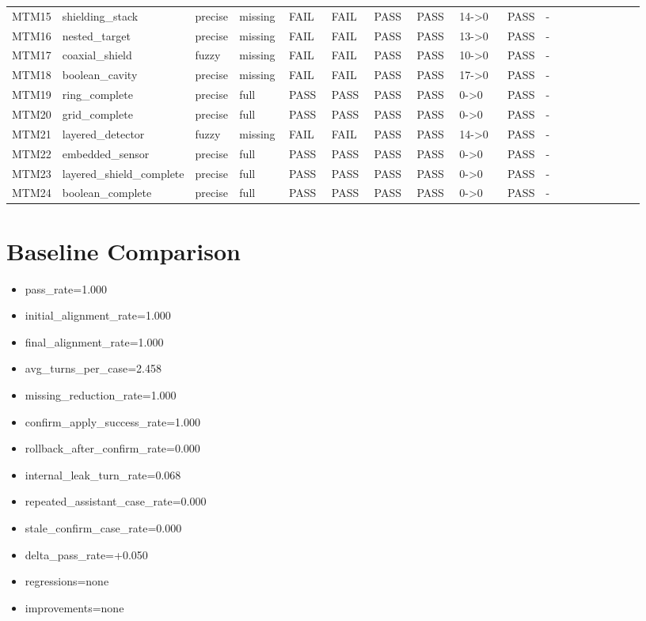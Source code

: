 \documentclass[11pt]{ctexart}
\begin{document}
\begin{longtable}{p{0.06\linewidth}p{0.08\linewidth}p{0.07\linewidth}p{0.08\linewidth}p{0.07\linewidth}p{0.07\linewidth}p{0.07\linewidth}p{0.07\linewidth}p{0.09\linewidth}p{0.06\linewidth}p{0.21\linewidth}}
MTM15 & shielding\_stack & precise & missing & FAIL & FAIL & PASS & PASS & 14->0 & PASS & - \\
MTM16 & nested\_target & precise & missing & FAIL & FAIL & PASS & PASS & 13->0 & PASS & - \\
MTM17 & coaxial\_shield & fuzzy & missing & FAIL & FAIL & PASS & PASS & 10->0 & PASS & - \\
MTM18 & boolean\_cavity & precise & missing & FAIL & FAIL & PASS & PASS & 17->0 & PASS & - \\
MTM19 & ring\_complete & precise & full & PASS & PASS & PASS & PASS & 0->0 & PASS & - \\
MTM20 & grid\_complete & precise & full & PASS & PASS & PASS & PASS & 0->0 & PASS & - \\
MTM21 & layered\_detector & fuzzy & missing & FAIL & FAIL & PASS & PASS & 14->0 & PASS & - \\
MTM22 & embedded\_sensor & precise & full & PASS & PASS & PASS & PASS & 0->0 & PASS & - \\
MTM23 & layered\_shield\_complete & precise & full & PASS & PASS & PASS & PASS & 0->0 & PASS & - \\
MTM24 & boolean\_complete & precise & full & PASS & PASS & PASS & PASS & 0->0 & PASS & - \\
\bottomrule
\end{longtable}
\section{Baseline Comparison}
\begin{itemize}
\item pass\_rate=1.000
\item initial\_alignment\_rate=1.000
\item final\_alignment\_rate=1.000
\item avg\_turns\_per\_case=2.458
\item missing\_reduction\_rate=1.000
\item confirm\_apply\_success\_rate=1.000
\item rollback\_after\_confirm\_rate=0.000
\item internal\_leak\_turn\_rate=0.068
\item repeated\_assistant\_case\_rate=0.000
\item stale\_confirm\_case\_rate=0.000
\item delta\_pass\_rate=+0.050
\item regressions=none
\item improvements=none
\end{itemize}
\appendix
\end{document}
